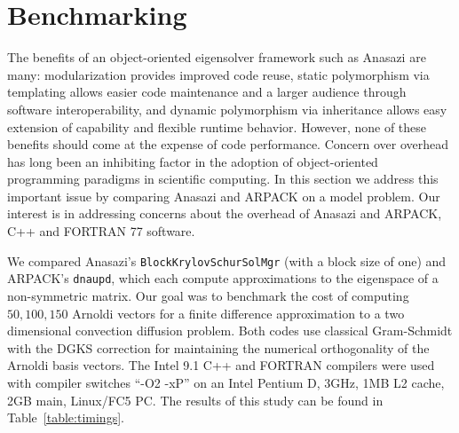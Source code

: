\documentclass[acmtoms]{acmtrans2m}
\newcommand{\aspace}[1]{\texttt{#1}}
\begin{document}

\section{Benchmarking}
\label{sec:benchmarking}

The benefits of an object-oriented eigensolver framework such as Anasazi are many:
modularization provides improved code reuse, static polymorphism via templating allows
easier code maintenance and a larger audience through software interoperability, and
dynamic polymorphism via inheritance allows easy extension of capability and flexible
runtime behavior. However, none of these benefits should come at the expense of code
performance. Concern over overhead has long been an inhibiting factor in the adoption of
object-oriented programming paradigms in scientific computing. In this section we 
address this important issue by comparing Anasazi and ARPACK on a model problem. Our
interest is in addressing concerns about the overhead of Anasazi and ARPACK, C++ and
FORTRAN 77 software.

We compared Anasazi's \aspace{BlockKrylovSchurSolMgr} (with a block size
of one) and ARPACK's \aspace{dnaupd}, which each compute approximations to the
eigenspace of a non-symmetric matrix. Our goal was to benchmark the
cost of computing $50, 100, 150$ Arnoldi vectors for a finite
difference approximation to a two dimensional convection diffusion
problem. Both codes use classical Gram-Schmidt with the DGKS \cite{dgks:76} 
correction for maintaining the numerical orthogonality of the Arnoldi basis
vectors.  The Intel 9.1 C++ and FORTRAN compilers were used with
compiler switches ``-O2 -xP'' on an Intel Pentium D, 3GHz, 1MB L2
cache, 2GB main, Linux/FC5 PC.  The results of this study can be found
in Table~\ref{table:timings}.
\end{document}
